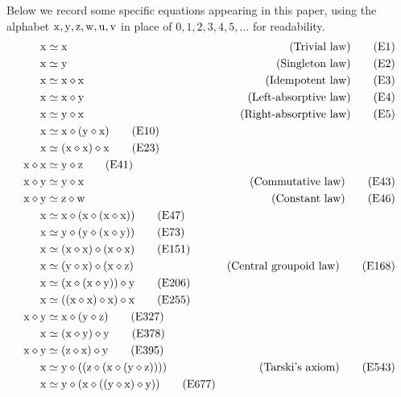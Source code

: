 Below we record some specific equations appearing in this paper, using the alphabet $\mathrm{x},\mathrm{y},\mathrm{z},\mathrm{w},\mathrm{u},\mathrm{v}$ in place of $0,1,2,3,4,5,\dots$ for readability.
\begin{align}
    \x &\formaleq \x & \hbox{(Trivial law)} \label{eq1}\tag{E1} \\
    \x &\formaleq \y & \hbox{(Singleton law)} \label{eq2}\tag{E2} \\
    \x &\formaleq \x \op \x & \hbox{(Idempotent law)} \label{eq3}\tag{E3} \\
    \x &\formaleq \x \op \y & \hbox{(Left-absorptive law)} \label{eq4}\tag{E4} \\
    \x &\formaleq \y \op \x & \hbox{(Right-absorptive law)} \label{eq5}\tag{E5} \\
    \x &\formaleq \x \op (\y \op \x) \label{eq10}\tag{E10} \\
    \x &\formaleq (\x \op \x) \op \x \label{eq23}\tag{E23} \\
    \x \op \x &\formaleq \y \op \z \label{eq41}\tag{E41} \\
    \x \op \y &\formaleq \y \op \x & \hbox{(Commutative law)} \label{eq43}\tag{E43} \\
    \x \op \y &\formaleq \z \op \w & \hbox{(Constant law)} \label{eq46}\tag{E46} \\
    \x &\formaleq \x \op (\x \op (\x \op \x)) \label{eq47}\tag{E47} \\
    \x &\formaleq \y \op (\y \op (\x \op \y))  \label{eq73}\tag{E73} \\
    \x &\formaleq (\x \op \x) \op (\x \op \x) \label{eq151}\tag{E151} \\
    \x &\formaleq (\y \op \x) \op (\x \op \z) & \hbox{(Central groupoid law)} \label{eq168}\tag{E168} \\
    \x &\formaleq (\x \op (\x \op \y)) \op \y \label{eq206}\tag{E206} \\
    \x &\formaleq ((\x \op \x) \op \x) \op \x \label{eq255}\tag{E255} \\
    \x \op \y &\formaleq \x \op (\y \op \z) \label{eq327}\tag{E327} \\
    \x &\formaleq (\x \op \y) \op \y \label{eq378}\tag{E378} \\
    \x \op \y &\formaleq (\z \op \x) \op \y \label{eq395}\tag{E395} \\
    \x &\formaleq \y \op ( (\z \op (\x \op (\y \op \z)))) & \hbox{(Tarski's axiom)} \label{eq543}\tag{E543} \\
    \x &\formaleq \y \op (\x \op ((\y \op \x) \op \y)) \label{eq677}\tag{E677} \\

\end{align}
